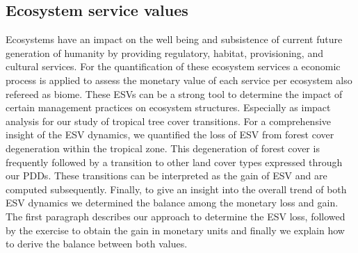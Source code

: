 	\subsection{Ecosystem service values}
		Ecosystems have an impact on the well being and subsistence of current future generation of humanity by providing regulatory, habitat, provisioning, and cultural services. For the quantification of these ecosystem services a economic process is applied to assess the monetary value of each service per ecosystem also refereed as biome. These \acp{ESV} can be a strong tool to determine the impact of certain management practices on ecosystem structures. Especially as impact analysis for our study of tropical tree cover transitions. For a comprehensive insight of the \ac{ESV} dynamics, we quantified the loss of \ac{ESV} from forest cover degeneration within the tropical zone. This degeneration of forest cover is frequently followed by a transition to other land cover types expressed through our \acp{PDD}. These transitions can be interpreted as the gain of \ac{ESV} and are computed subsequently. Finally, to give an insight into the overall trend of both \ac{ESV} dynamics we determined the balance among the monetary loss and gain. The first paragraph describes our approach to determine the \ac{ESV} loss, followed by the exercise to obtain the gain in monetary units and finally we explain how to derive the balance between both values.  

